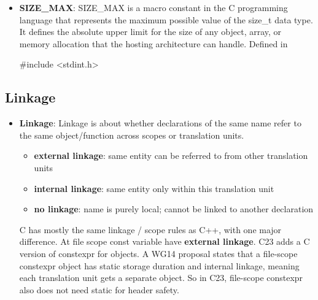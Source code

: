 \documentclass{report}
\begin{document}
\begin{itemize}
\begin{cppcode}
{                    union {
                        int i;
                        double d;
                        char* s;
                    } as;
                };
            \end{cppcode}
            \bigbreak \noindent 
            The kind field tells you which union member is currently valid.
            \item \textbf{SIZE\_MAX}: SIZE\_MAX is a macro constant in the C programming language that represents the maximum possible value of the size\_t data type. It defines the absolute upper limit for the size of any object, array, or memory allocation that the hosting architecture can handle.
                \bigbreak \noindent 
                Defined in
                \bigbreak \noindent 
                \begin{cppcode}
                #include <stdint.h>
                \end{cppcode}
        \end{itemize}

        \pagebreak 
        \subsection{Linkage}
        \begin{itemize}
            \item \textbf{Linkage}: Linkage is about whether declarations of the same name refer to the same object/function across scopes or translation units.
                \begin{itemize}
                    \item \textbf{external linkage}:   same entity can be referred to from other translation units
                    \item \textbf{internal linkage}:   same entity only within this translation unit
                    \item \textbf{no linkage}:         name is purely local; cannot be linked to another declaration
                \end{itemize}
                C has mostly the same linkage / scope rules as C++, with one major difference. At file scope const variable have \textbf{external linkage}.
                \bigbreak \noindent 
                C23 adds a C version of constexpr for objects. A WG14 proposal states that a file-scope constexpr object has static storage duration and internal linkage, meaning each translation unit gets a separate object. So in C23, file-scope constexpr also does not need static for header safety.
        \end{itemize}
\end{document}
